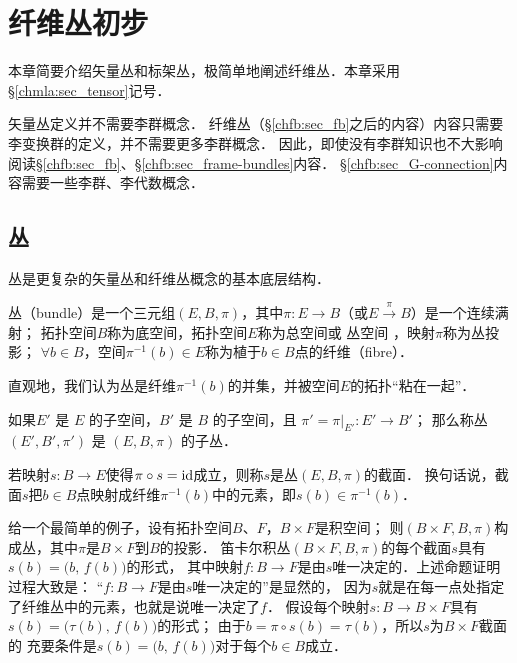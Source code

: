 
\chapter{纤维丛初步}\label{chfb}

本章简要介绍矢量丛和标架丛，极简单地阐述纤维丛．本章采用\S\ref{chmla:sec_tensor}记号．

矢量丛定义并不需要李群概念．
纤维丛（\S\ref{chfb:sec_fb}之后的内容）内容只需要李变换群的定义，并不需要更多李群概念．
因此，即使没有李群知识也不大影响阅读\S\ref{chfb:sec_fb}、\S\ref{chfb:sec_frame-bundles}内容．
\S\ref{chfb:sec_G-connection}内容需要一些李群、李代数概念．

\section{丛}
丛是更复杂的矢量丛和纤维丛概念的基本底层结构．

\begin{definition}
    {\heiti 丛}（bundle）是一个三元组$(E, B, \pi)$，其中$\pi: E\to B$（或$E\xrightarrow{\pi} B$）是一个连续满射；
    拓扑空间$B$称为{\heiti 底空间}，拓扑空间$E$称为{\heiti 总空间}或 {\heiti 丛空间} ，映射$\pi$称为{\heiti 丛投影}；
    $\forall b\in B$，空间$\pi^{-1}(b)\in E$称为植于$ b\in B$点的{\heiti 纤维}（fibre）．
\end{definition}
直观地，我们认为丛是纤维$\pi^{-1}(b)$的并集，并被空间$E$的拓扑“粘在一起”．


\begin{definition}
     如果$E'$ 是 $E$ 的子空间，$B'$ 是 $B$ 的子空间，且 $ \pi' = \pi |_{E'}: E'\to B'$；
     那么称丛 $(E',  B',\pi')$ 是 $(E, B,\pi)$ 的{\heiti 子丛}．
\end{definition}

\begin{definition}
    若映射$s: B\to E$使得$\pi \circ s = {\rm id}$成立，则称$s$是丛$(E, B,\pi)$的{\heiti 截面}．
    换句话说，截面$s$把$b\in B$点映射成纤维$\pi^{-1}(b)$中的元素，即$s(b)\in \pi^{-1}(b)$．
\end{definition}
    


给一个最简单的例子，设有拓扑空间$B$、$F$，$B\times F$是积空间；
则$(B\times F, B,\pi)$构成丛，其中$\pi$是$B\times F$到$B$的投影．
笛卡尔积丛$(B \times F, B,\pi)$的每个截面$s$具有$s(b) = \bigl(b,\, f(b)\bigr)$的形式，
其中映射$f: B\to F$是由$s$唯一决定的．上述命题证明过程大致是：
“$f: B\to F$是由$s$唯一决定的”是显然的，
因为$s$就是在每一点处指定了纤维丛中的元素，也就是说唯一决定了$f$．
假设每个映射$s: B\to B\times F$具有$s(b) = \bigl(\tau(b), \, f (b)\bigr)$的形式；
由于$b=\pi \circ s(b) = \tau(b)$，所以$s$为$B\times F$截面的
充要条件是$s(b) = \bigl(b,\, f(b)\bigr)$对于每个$b\in B$成立．

